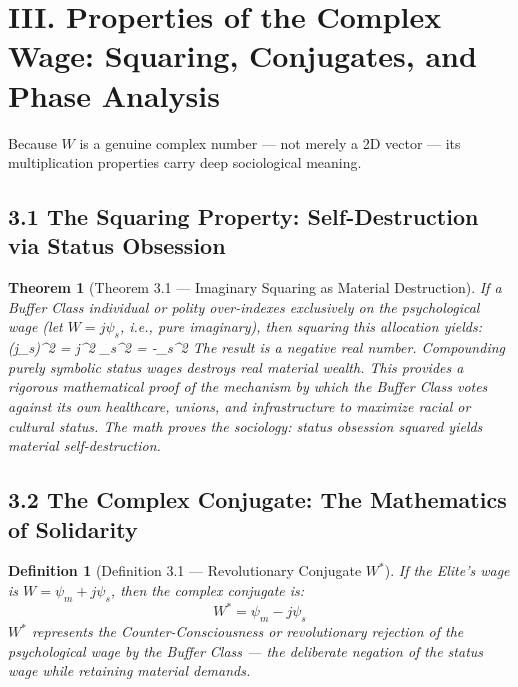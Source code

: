 \documentclass[12pt]{book}
\numberwithin{equation}{chapter}
\newtheorem{theorem}{Theorem}[chapter]
\newtheorem{definition}{Definition}[chapter]
\begin{document}
\section{III. Properties of the Complex Wage: Squaring, Conjugates, and Phase Analysis}

    Because $W$ is a genuine complex number — not merely a 2D vector — its multiplication properties carry deep sociological meaning.
  

\subsection{3.1 The Squaring Property: Self-Destruction via Status Obsession}

\begin{theorem}[Theorem 3.1 — Imaginary Squaring as Material Destruction]
If a Buffer Class individual or polity over-indexes exclusively on the psychological wage (let $W = j\psi_s$, i.e., pure imaginary), then squaring this allocation yields:
      (j\psi_s)^2 = j^2 \psi_s^2 = -\psi_s^2
    The result is a \emph{negative real number}. Compounding purely symbolic status wages destroys real material wealth. This provides a rigorous mathematical proof of the mechanism by which the Buffer Class votes against its own healthcare, unions, and infrastructure to maximize racial or cultural status. The math proves the sociology: status obsession squared yields material self-destruction.
  \end{theorem}

\subsection{3.2 The Complex Conjugate: The Mathematics of Solidarity}

\begin{definition}[Definition 3.1 — Revolutionary Conjugate $W^*$]
If the Elite's wage is $W = \psi_m + j\psi_s$, then the complex conjugate is:
      \[ W^* = \psi_m - j\psi_s \]
    $W^*$ represents the \emph{Counter-Consciousness} or revolutionary rejection of the psychological wage by the Buffer Class — the deliberate negation of the status wage while retaining material demands.
  \end{definition}
\end{document}
